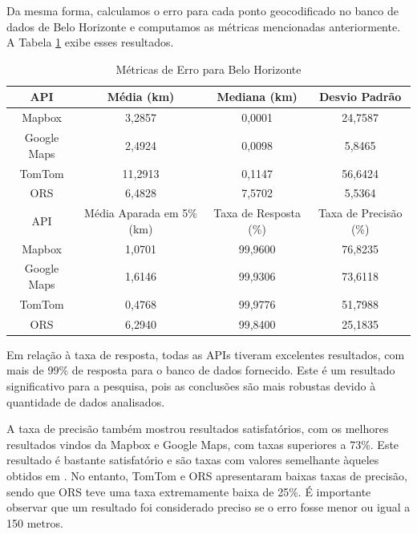 Da mesma forma, calculamos o erro para cada ponto geocodificado no banco de dados de Belo Horizonte e computamos as métricas mencionadas anteriormente. A Tabela \ref{tab:tabelaDeMetricasBH} exibe esses resultados.

\begin{table}[!ht]
    \centering
    \caption{Métricas de Erro para Belo Horizonte}
    \label{tab:tabelaDeMetricasBH}
    \begin{adjustbox}{width=0.7\textwidth}
    \begin{tabular}{|c|c|c|c|}
    \hline
    API & Média (km) & Mediana (km) & Desvio Padrão \\
    \hline
    Mapbox & 3,2857 & 0,0001 & 24,7587 \\
    Google Maps & 2,4924 & 0,0098 & 5,8465 \\
    TomTom & 11,2913 & 0,1147 & 56,6424 \\
    ORS & 6,4828 & 7,5702 & 5,5364 \\
    \hline
    \hline
    API & Média Aparada em 5\% (km) & Taxa de Resposta (\%) & Taxa de Precisão (\%) \\
    \hline
    Mapbox & 1,0701 & 99,9600 & 76,8235 \\
    Google Maps & 1,6146 & 99,9306 & 73,6118 \\
    TomTom & 0,4768 & 99,9776 & 51,7988 \\
    ORS & 6,2940 & 99,8400 & 25,1835 \\
    \hline
    \end{tabular}
    \end{adjustbox}
\end{table}

Em relação à taxa de resposta, todas as APIs tiveram excelentes resultados, com mais de 99\% de resposta para o banco de dados fornecido. Este é um resultado significativo para a pesquisa, pois as conclusões são mais robustas devido à quantidade de dados analisados.

A taxa de precisão também mostrou resultados satisfatórios, com os melhores resultados vindos da Mapbox e Google Maps, com taxas superiores a 73\%. Este resultado é bastante satisfatório e são taxas com valores semelhante àqueles obtidos em \cite{Clodoveu2011}. No entanto, TomTom e ORS apresentaram baixas taxas de precisão, sendo que ORS teve uma taxa extremamente baixa de 25\%. É importante observar que um resultado foi considerado preciso se o erro fosse menor ou igual a 150 metros.

